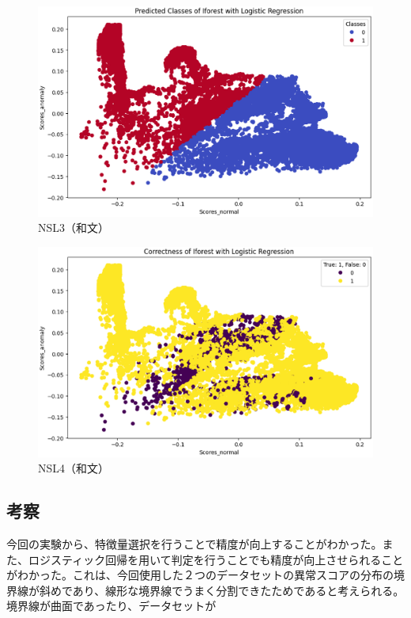 \documentclass{css}
\begin{document}
\begin{figure}[tb]
    \centering
    \includegraphics[width=\linewidth]{pictures/eps/NSL3.eps}
    \caption{NSL3（和文）}
    \label{fig:NSL3}
\end{figure}

\begin{figure}[tb]
    \centering
    \includegraphics[width=\linewidth]{pictures/eps/NSL4.eps}
    \caption{NSL4（和文）}
    \label{fig:NSL4}
\end{figure}

\subsection{考察}
今回の実験から、特徴量選択を行うことで精度が向上することがわかった。また、ロジスティック回帰を用いて判定を行うことでも精度が向上させられることがわかった。これは、今回使用した２つのデータセットの異常スコアの分布の境界線が斜めであり、線形な境界線でうまく分割できたためであると考えられる。
境界線が曲面であったり、データセットが
\end{document}
